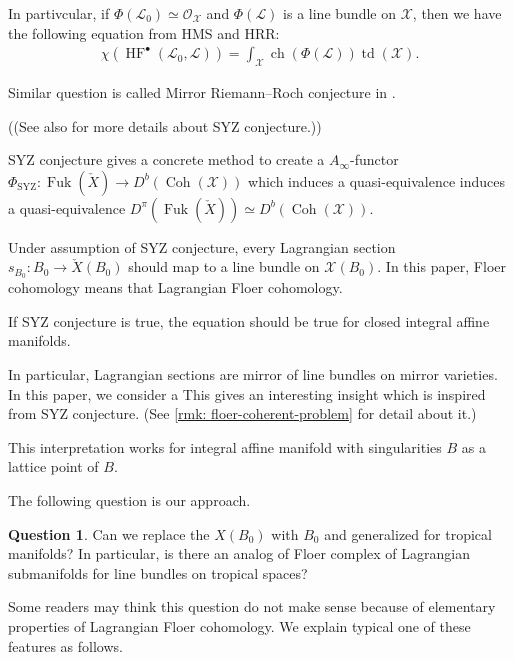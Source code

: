 \documentclass[a4paper,dvipdfmx,reqno,12pt]{amsart}
\theoremstyle{definition}
\newtheorem{question}[theorem]{Question}
\newcommand{\mcal}[1]{\mathcal{#1}}%
\newcommand{\opn}[1]{\operatorname{#1}}
\numberwithin{equation}{section}
\begin{document}
In partivcular, if $\Phi(\mathscr{L}_0)
  \simeq \mcal{O}_{\mathcal{X}}$ and 
$\Phi(\mathscr{L})$ is a line bundle on $\mathcal{X}$,
then we have the following equation 
from HMS and HRR:
\begin{align}
\label{equation-MRR}
\chi (\opn{HF}^{\bullet}(\mathscr{L}_0,\mathscr{L}))=
\int_{\mathcal{X}}\opn{ch}(\Phi(\mathscr{L}))
\opn{td}(\mathcal{X}).
\end{align}

Similar question is called 
Mirror Riemann--Roch conjecture in 
\cite[Conjecture 4.9]{grossSpecialLagrangianFibrations1998a}.

((See also 
\cite[.2,
.7]{MR2567952} for more details about 
SYZ conjecture.))

SYZ conjecture gives a concrete method to create 
a $A_{\infty}$-functor 
$\Phi_{\mathrm{SYZ}}\colon 
\opn{Fuk}(\check{X})\to D^{b}(\opn{Coh}(
\mathcal{X}))$
which induces a quasi-equivalence
induces a quasi-equivalence 
$D^{\pi}(\opn{Fuk}(\check{X}))\simeq 
D^{b}(\opn{Coh}(\mathcal{X}))$.

Under assumption of SYZ conjecture, 
every Lagrangian section 
$s_{B_0}\colon B_0\to \check{X}(B_0)$ 
should map to a line bundle on 
$\mathcal{X}(B_0)$. 
In this paper, Floer cohomology means that 
Lagrangian Floer cohomology.


If SYZ conjecture is true, the equation should be
true for closed integral affine manifolds.


In particular, Lagrangian sections are mirror of line bundles on
mirror varieties. 
In this paper, we consider a 
This gives an interesting insight which is inspired from
SYZ conjecture.
(See \cref{rmk: floer-coherent-problem} 
for detail about it.)

This interpretation works for integral affine manifold 
with singularities $B$ as a lattice point of $B$. 






The following question is our approach.
\begin{question}
\label{question-MRR}
Can we replace the $X(B_0)$ with $B_0$ and generalized 
for tropical manifolds?
In particular, is there an analog of Floer complex of
Lagrangian submanifolds for line bundles on 
tropical spaces?  
\end{question}

Some readers may think this question do not make sense
because of elementary properties of 
Lagrangian Floer cohomology. 
We explain typical one of these features as follows.
\end{document}
